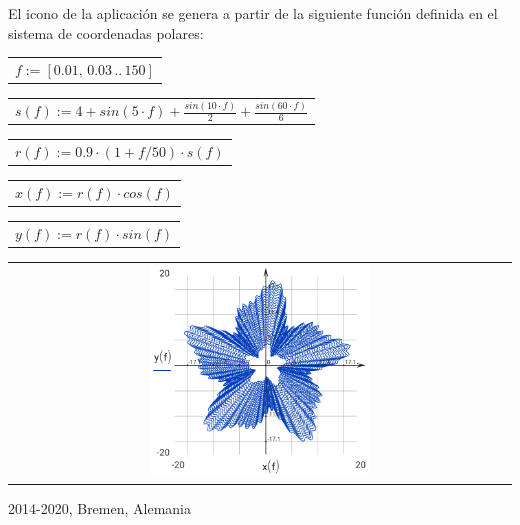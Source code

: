 \documentclass[DIV=calc, paper=a4, fontsize=11pt, twocolumn]{scrartcl}
\begin{document}
El icono de la aplicación se genera a
partir de la siguiente función
definida en el sistema de coordenadas
polares:
\begin{center}\begin{tabular}{c}
                $f := \left[ 0.01,\, 0.03 \,..\, 150 \right]$
\end{tabular}\end{center}
\begin{center}\begin{tabular}{c}
                $s(f) := 4 + sin \left( 5 \cdot f\right)  + \frac{sin \left( 10 \cdot f\right) }{2} + \frac{sin \left( 60 \cdot f\right) }{6}$
\end{tabular}\end{center}
\begin{center}\begin{tabular}{c}
                $r(f) := 0.9 \cdot \left( 1 + f / 50 \right) \cdot s \left( f\right) $
\end{tabular}\end{center}
\begin{center}\begin{tabular}{c}
                $x(f) := r \left( f\right)  \cdot cos \left( f\right) $
\end{tabular}\end{center}
\begin{center}\begin{tabular}{c}
                $y(f) := r \left( f\right)  \cdot sin \left( f\right) $
\end{tabular}\end{center}
\begin{center}\begin{tabular}{c} \includegraphics[width=0.45\textwidth]{graphics/about_micromath_fig1.png} \end{tabular}\end{center}

2014-2020, Bremen, Alemania
\end{document}
